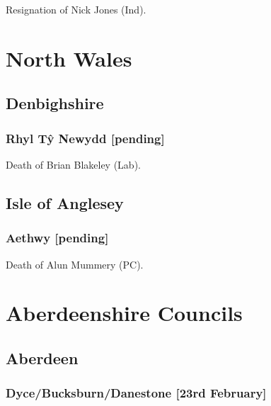 \documentclass[a4paper,openany]{book}
\begin{document}
\begin{resultsiii}

Resignation of Nick Jones (Ind).

\section{North Wales}

\subsection*{Denbighshire}

\subsubsection*{Rhyl Tŷ Newydd \hspace*{\fill}\nolinebreak[1]%
	\enspace\hspace*{\fill}
	[pending]}


Death of Brian Blakeley (Lab).

\subsection*{Isle of Anglesey}

\subsubsection*{Aethwy \hspace*{\fill}\nolinebreak[1]%
	\enspace\hspace*{\fill}
	[pending]}


Death of Alun Mummery (PC).

\section{Aberdeenshire Councils}

\subsection*{Aberdeen}

\subsubsection*{Dyce\slash Bucksburn\slash Danestone \hspace*{\fill}\nolinebreak[1]%
	\enspace\hspace*{\fill}
	[23rd February]}


\end{resultsiii}
\end{document}
